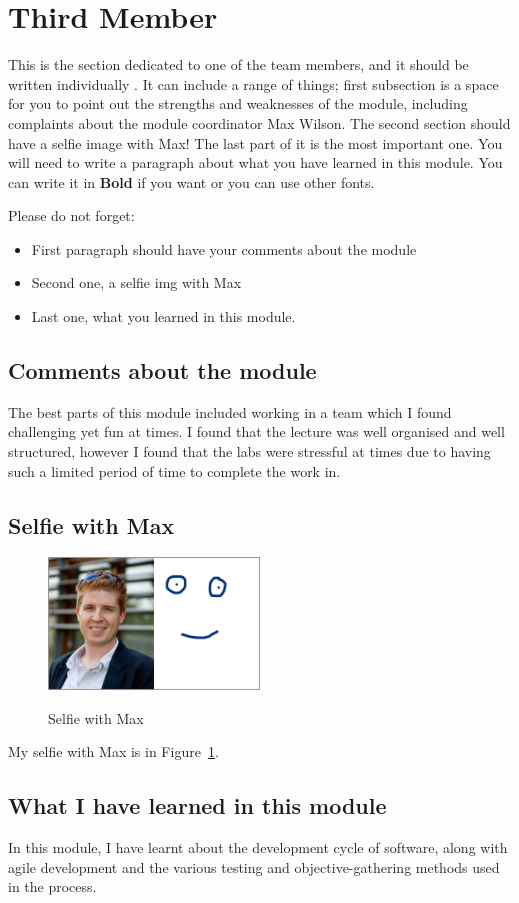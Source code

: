 \section{Third Member}
This is the section dedicated to one of the team members, and it should be written individually . It can include a range of things; first subsection is a space for you to point out the strengths and weaknesses of the module, including complaints about the module coordinator Max Wilson. The second section should have a selfie image with Max! The last part of it is the most important one. You will need to write a paragraph about what you have learned in this module. You can write it in \textbf{Bold} if you want or you can use other fonts. 

Please do not forget:
\begin{itemize}
	\item First paragraph should have your comments about the module
	\item Second one, a selfie img with Max
	\item Last one, what you learned in this module.
\end{itemize}

\subsection{Comments about the module}
The best parts of this module included working in a team which I found challenging yet fun at times.  I found that the lecture was well organised and well structured, however I found that the labs were stressful at times due to having such a limited period of time to complete the work in. 

\subsection{Selfie with Max}
\begin{figure}[h]
\caption{Selfie with Max}
\centering
\includegraphics[width=0.5\textwidth]{imgWithMaxThird}
\label{fig:selfie}
\end{figure}

My selfie with Max is in Figure~\ref{fig:selfie}.

\subsection{What I have learned in this module}
In this module, I have learnt about the development cycle of software, along with agile development and the various testing and objective-gathering methods used in the process.

